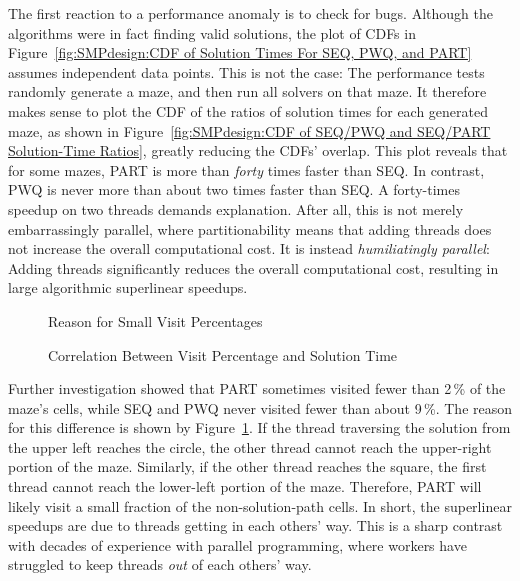 The first reaction to a performance anomaly is to check for bugs.
Although the algorithms were in fact finding valid solutions, the
plot of CDFs in
Figure~\ref{fig:SMPdesign:CDF of Solution Times For SEQ, PWQ, and PART}
assumes independent data points.
This is not the case:  The performance tests randomly generate a maze,
and then run all solvers on that maze.
It therefore makes sense to plot the CDF of the ratios of
solution times for each generated maze,
as shown in
Figure~\ref{fig:SMPdesign:CDF of SEQ/PWQ and SEQ/PART Solution-Time Ratios},
greatly reducing the CDFs' overlap.
This plot reveals that for some mazes, PART
is more than \emph{forty} times faster than SEQ.
In contrast, PWQ is never more than about
two times faster than SEQ.
A forty-times speedup on two threads demands explanation.
After all, this is not merely embarrassingly parallel, where partitionability
means that adding threads does not increase the overall computational cost.
It is instead \emph{humiliatingly parallel}: Adding threads
significantly reduces the overall computational cost, resulting in
large algorithmic superlinear speedups.

\begin{figure}[tb]
\centering
{}
\caption{Reason for Small Visit Percentages}
\label{fig:SMPdesign:Reason for Small Visit Percentages}
\end{figure}

\begin{figure}[tb]
\centering
{}
\caption{Correlation Between Visit Percentage and Solution Time}
\label{fig:SMPdesign:Correlation Between Visit Percentage and Solution Time}
\end{figure}

Further investigation showed that
PART sometimes visited fewer than 2\,\% of the maze's cells,
while SEQ and PWQ never visited fewer than about 9\,\%.
The reason for this difference is shown by
Figure~\ref{fig:SMPdesign:Reason for Small Visit Percentages}.
If the thread traversing the solution from the upper left reaches
the circle, the other thread cannot reach
the upper-right portion of the maze.
Similarly, if the other thread reaches the square,
the first thread cannot reach the lower-left
portion of the maze.
Therefore, PART will likely visit a small fraction
of the non-solution-path cells.
In short, the superlinear speedups are due to threads getting in each
others' way.
This is a sharp contrast with decades of experience with
parallel programming, where workers have struggled
to keep threads \emph{out} of each others' way.

